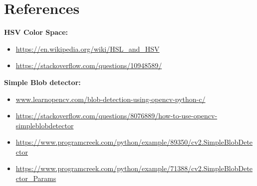 \section{References}
\textbf{HSV Color Space:}
\begin{itemize}
\item \url{https://en.wikipedia.org/wiki/HSL_and_HSV}
\item \href{https://stackoverflow.com/questions/10948589/choosing-the-correct-upper-and-lower-hsv-boundaries-for-color-detection-withcv}{https://stackoverflow.com/questions/10948589/}
\end{itemize}

\textbf{Simple Blob detector:}
\begin{itemize}
\item \url{www.learnopencv.com/blob-detection-using-opencv-python-c/}
\item \href{https://stackoverflow.com/questions/8076889/}{https://stackoverflow.com/questions/8076889/how-to-use-opencv-simpleblobdetector}
\item \url{https://www.programcreek.com/python/example/89350/cv2.SimpleBlobDetector}
\item \url{https://www.programcreek.com/python/example/71388/cv2.SimpleBlobDetector_Params}
\end{itemize}

